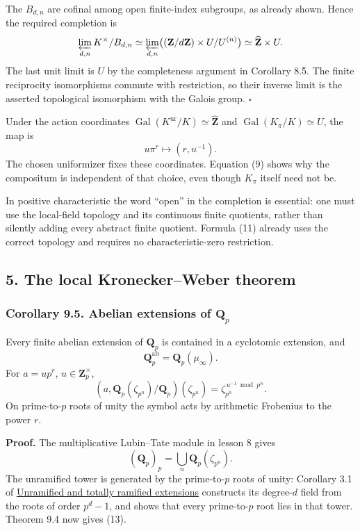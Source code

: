 \documentclass[11pt,a4paper]{article}
\begin{document}
The \(B_{d,n}\) are cofinal among open finite-index subgroups, as
already shown. Hence the required completion is \[
\varprojlim_{d,n}K^\times/B_{d,n}
 \simeq\varprojlim_{d,n}
       \bigl((\mathbf Z/d\mathbf Z)\times U/U^{(n)}\bigr)
 \simeq\widehat{\mathbf Z}\times U.
\] The last unit limit is \(U\) by the completeness argument in
Corollary 8.5. The finite reciprocity isomorphisms commute with
restriction, so their inverse limit is the asserted topological
isomorphism with the Galois group. \(\square\)

Under the action coordinates
\(\operatorname{Gal}(K^{\mathrm{ur}}/K)\simeq\widehat{\mathbf Z}\) and
\(\operatorname{Gal}(K_\pi/K)\simeq U\), the map is \[
u\pi^r\longmapsto(r,u^{-1}).
\tag{12}
\] The chosen uniformizer fixes these coordinates. Equation (9) shows
why the compositum is independent of that choice, even though \(K_\pi\)
itself need not be.

In positive characteristic the word ``open'' in the completion is
essential: one must use the local-field topology and its continuous
finite quotients, rather than silently adding every abstract finite
quotient. Formula (11) already uses the correct topology and requires no
characteristic-zero restriction.

\subsection{5. The local Kronecker--Weber
theorem}\label{the-local-kroneckerweber-theorem}

\subsubsection{\texorpdfstring{Corollary 9.5. Abelian extensions of
\(\mathbf Q_p\)}{Corollary 9.5. Abelian extensions of \textbackslash mathbf Q\_p}}\label{corollary-9.5.-abelian-extensions-of-mathbf-q_p}

Every finite abelian extension of \(\mathbf Q_p\) is contained in a
cyclotomic extension, and \[
\mathbf Q_p^{\mathrm{ab}}=\mathbf Q_p(\mu_\infty).
\tag{13}
\] For \(a=up^r\), \(u\in\mathbf Z_p^\times\), \[
(a,\mathbf Q_p(\zeta_{p^n})/\mathbf Q_p)(\zeta_{p^n})
 =\zeta_{p^n}^{\,u^{-1}\bmod p^n}.
\tag{14}
\] On prime-to-\(p\) roots of unity the symbol acts by arithmetic
Frobenius to the power \(r\).

\textbf{Proof.} The multiplicative Lubin--Tate module in lesson 8 gives
\[
(\mathbf Q_p)_p=\bigcup_n\mathbf Q_p(\zeta_{p^n}).
\] The unramified tower is generated by the prime-to-\(p\) roots of
unity: Corollary 3.1 of
\href{https://kokunoyumeto.github.io/open-math-courses/courses/NT-CFT/proof-dependencies.html\#NT-LOC-07}{Unramified
and totally ramified extensions} constructs its degree-\(d\) field from
the roots of order \(p^d-1\), and shows that every prime-to-\(p\) root
lies in that tower. Theorem 9.4 now gives (13).
\end{document}

